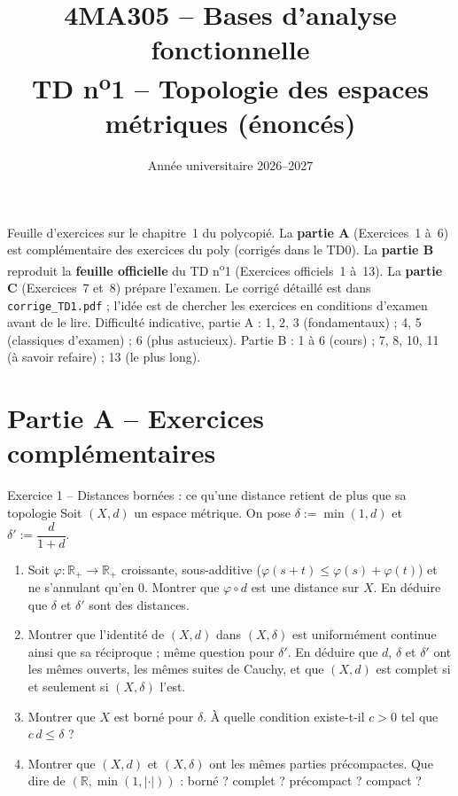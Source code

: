 \documentclass[11pt,a4paper]{article}
\title{\textbf{4MA305 -- Bases d'analyse fonctionnelle}\\[2mm]
\Large TD n\textsuperscript{o}1 -- Topologie des espaces métriques (énoncés)}
\author{}
\date{Année universitaire 2026--2027}
\newcommand{\R}{\mathbb{R}}
\theoremstyle{definition}
\begin{document}
\maketitle

\begin{commentaire}
Feuille d'exercices sur le chapitre~1 du polycopié. La \textbf{partie A} (Exercices~1 à~6) est complémentaire des exercices du poly (corrigés dans le TD0). La \textbf{partie B} reproduit la \textbf{feuille officielle} du TD n\textsuperscript{o}1 (Exercices officiels~1 à~13). La \textbf{partie C} (Exercices~7 et~8) prépare l'examen. Le corrigé détaillé est dans \texttt{corrige\_TD1.pdf} ; l'idée est de chercher les exercices en conditions d'examen avant de le lire. Difficulté indicative, partie A : 1, 2, 3 (fondamentaux) ; 4, 5 (classiques d'examen) ; 6 (plus astucieux). Partie B : 1 à 6 (cours) ; 7, 8, 10, 11 (à savoir refaire) ; 13 (le plus long).
\end{commentaire}

\section*{Partie A -- Exercices complémentaires}

\begin{exo}{Exercice 1 -- Distances bornées : ce qu'une distance retient de plus que sa topologie}
Soit $(X,d)$ un espace métrique. On pose $\delta:=\min(1,d)$ et $\delta':=\dfrac d{1+d}$.
\begin{enumerate}[label=(\alph*)]
  \item Soit $\varphi:\R_+\to\R_+$ croissante, sous-additive ($\varphi(s+t)\le\varphi(s)+\varphi(t)$) et ne s'annulant qu'en $0$. Montrer que $\varphi\circ d$ est une distance sur $X$. En déduire que $\delta$ et $\delta'$ sont des distances.
  \item Montrer que l'identité de $(X,d)$ dans $(X,\delta)$ est uniformément continue ainsi que sa réciproque ; même question pour $\delta'$. En déduire que $d$, $\delta$ et $\delta'$ ont les mêmes ouverts, les mêmes suites de Cauchy, et que $(X,d)$ est complet si et seulement si $(X,\delta)$ l'est.
  \item Montrer que $X$ est borné pour $\delta$. À quelle condition existe-t-il $c>0$ tel que $c\,d\le\delta$ ?
  \item Montrer que $(X,d)$ et $(X,\delta)$ ont les mêmes parties précompactes. Que dire de $(\R,\min(1,|\cdot|))$ : borné ? complet ? précompact ? compact ?
\end{enumerate}
\end{exo}
\end{document}
